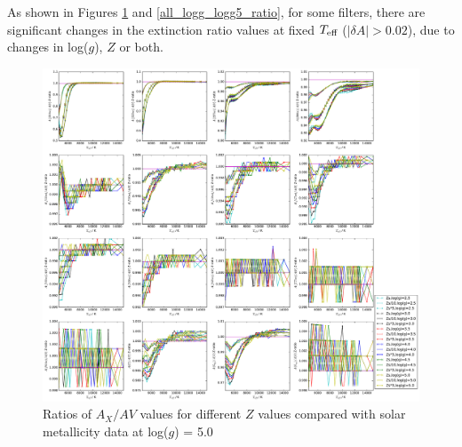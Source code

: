 \documentclass[12pt, a4paper]{report}
\begin{document}
As shown in Figures \ref{all_Z_Z2_ratio} and \ref{all_logg_logg5_ratio}, for some filters, there are significant changes in the extinction ratio values at fixed $T_{\textnormal{eff}}$ ($|\delta A| > 0.02$), due to changes in log($g$), $Z$ or both.

\begin{figure}[h]
\begin{center}
\includegraphics[scale=0.3]{../Aall_ratio_Zs_div_Z2_effect_high_logg_zoom_15000.pdf}
\caption{Ratios of $A_{X}/A{V}$ values for different $Z$ values compared with solar metallicity data at log($g$) = 5.0}
\label{all_Z_Z2_ratio}
\end{center}
\end{figure}
\end{document}
